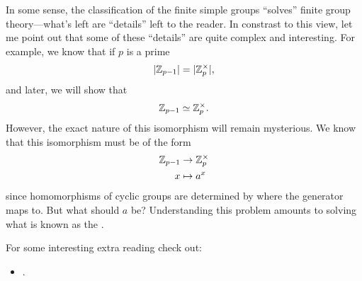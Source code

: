 \documentclass{ximera}
\begin{document}
In some sense, the classification of the finite simple groups
``solves'' finite group theory---what's left are ``details'' left to
the reader. In constrast to this view, let me point out that some of
these ``details'' are quite complex and interesting. For example, we
know that if $p$ is a prime
\[
|\mathbb Z_{p-1}|= | \mathbb Z_p^\times|,
\]
and later, we will show that
\[
\mathbb Z_{p-1}\simeq \mathbb Z_p^\times.
\]
However, the exact nature of this isomorphism will remain
mysterious. We know that this isomorphism must be of the form
\begin{align*}
  \mathbb Z_{p-1} &\to \mathbb Z_p^\times\\
  x &\mapsto a^x
\end{align*}
since homomorphisms of cyclic groups are determined by where the
generator maps to. But what should $a$ be?  Understanding this problem
amounts to solving what is known as the .








For some interesting extra reading check out:
\begin{itemize}
\item {}.


\end{itemize}
\end{document}
